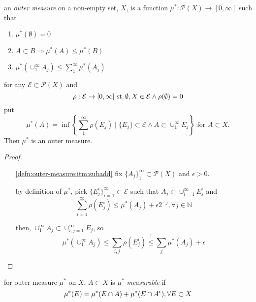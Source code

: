 \begin{defn}
  an \emph{outer measure} on a non-empty set, $X$, is a function
  ${\mu^*:\mathscr{P}(X)\rightarrow[0,\infty]}$ such that
  \begin{enumerate}[label=(\roman*)]
  \item\label{defn:outer-measure:itm:1}
    ${\mu^*(\emptyset)=0}$
  \item\label{defn:outer-measure:itm:2}
    ${A\subset B\Rightarrow\mu^*(A)\leq\mu^*(B)}$
  \item\label{defn:outer-measure:itm:subadd}
    ${\mu^*(\cup_1^\infty A_j)\leq\sum_1^\infty \mu^*(A_j)}$
  \end{enumerate}
\end{defn}

\begin{prop}\label{prop:1.10}\label{prop:01:induced-outer-measure}
  for any ${\mathcal{E}\subset\mathscr{P}(X)}$ and
  \[
  \rho:\mathcal{E}\rightarrow[0,\infty]
  \operatorname{\,st.}
  \emptyset, X\in\mathcal{E} \land \rho(\emptyset) = 0
  \]
  put
  \[
  \mu^*(A) = \inf\left\{\sum_1^\infty \rho(E_j)\mid
  \{E_j\}\subset\mathcal{E} \land A\subset\cup_1^\infty E_j\right\}
  \text{ for } A\subset X.
  \]
  Then $\mu^*$ is an outer measure.
\end{prop}
\begin{proof}\
  \sketch{todo:
    \ref{defn:outer-measure:itm:1} and \ref{defn:outer-measure:itm:2}
  }
  \begin{itemize}
  \item[\ref{defn:outer-measure:itm:subadd}]
    fix ${\{A_j\}_1^\infty\subset\mathscr{P}(X)}$ and ${\epsilon>0}$.

    by definition of $\mu^*$, pick
    ${\{E_j^i\}_{i=1}^\infty\subset\mathcal{E}}$
    such that
    ${A_j\subset\cup_{i=1}^\infty E_j^i}$
    and
    \begin{equation}
    \sum_{i=1}^\infty \rho(E_j^i) \leq \mu^*(A_j)+\epsilon 2^{-j},
    \forall j\in \mathbb{N}
    \tag{\dag}
    \end{equation}

    then,
    ${\cup_1^\infty A_j\subset\cup_{i,j=1}^\infty E_j}$,
    so
    \[
    \mu^*(\cup_1^\infty A_j) \leq
    \sum_{i,j} \rho(E_j^i)
    \stackrel{\dag}{\leq}
    \sum_j \mu^*(A_j) + \epsilon
    \]
  \end{itemize}
\end{proof}

\begin{defn}
  for outer measure $\mu^*$ on $X$, ${A\subset X}$ is
  \emph{$\mu^*$-measurable} if
  \[
  \mu^*(E)=\mu^*(E\cap A) + \mu^*(E\cap {A}^{\mathsf{c}}),
  \forall E\subset X
  \]
\end{defn}

